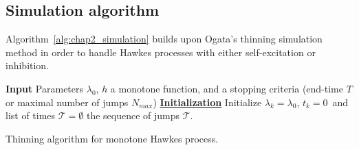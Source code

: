 \begin{subappendices}
\section{Simulation algorithm}
\label{app:chap2_simulation}

Algorithm~\ref{alg:chap2_simulation} builds upon Ogata's thinning simulation method \parencite[Proposition 1]{Ogata1981} in order to handle Hawkes processes with either self-excitation or inhibition.

\begin{algorithm}[!ht]
\SetAlgoLined
 \textbf{Input} Parameters $\lambda_0$, $h$ a monotone function, and a stopping criteria (end-time $T$ or maximal number of jumps $N_{max}$)\;
 \textbf{\underline{Initialization}} Initialize $\lambda_k =\lambda_0$, $t_k=0$\ and list of times $\mathcal{T} = \emptyset$\;
 \Return the sequence of jumps $\mathcal{T}$.
 \caption{Thinning algorithm for monotone Hawkes process.}
 \label{alg:chap2_simulation}
\end{algorithm}

\end{subappendices}